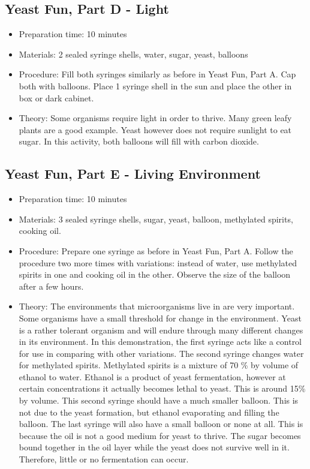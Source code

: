 \subsection{Yeast Fun, Part D - Light}
\begin{itemize}
\item{Preparation time: 10 minutes}
\item{Materials: 2 sealed syringe shells, water, sugar, yeast, balloons}
\item{Procedure: Fill both syringes similarly as before in Yeast Fun, Part A. Cap both with balloons. Place 1 syringe shell in the sun and place the other in box or dark cabinet.}
\item{Theory: Some organisms require light in order to thrive. Many green leafy plants are a good example. Yeast however does not require sunlight to eat sugar. In this activity, both balloons will fill with carbon dioxide.}
\end{itemize}


\subsection{Yeast Fun, Part E - Living Environment}
\begin{itemize}
\item{Preparation time: 10 minutes}
\item{Materials:  3 sealed syringe shells, sugar, yeast, balloon, methylated spirits, cooking oil.}
\item{Procedure: Prepare one syringe as before in Yeast Fun, Part A. Follow the procedure two more times with variations: instead of water, use methylated spirits in one and cooking oil in the other. Observe the size of the balloon after a few hours. }
\item{Theory: The environments that microorganisms live in are very important. Some organisms have a small threshold for change in the environment. Yeast is a rather tolerant organism and will endure through many different changes in its environment. In this demonstration, the first syringe acts like a control for use in comparing with other variations. The second syringe changes water for methylated spirits. Methylated spirits is a mixture of 70 \% by volume of ethanol to water. Ethanol is a product of yeast fermentation, however at certain concentrations it actually becomes lethal to yeast. This is around 15\% by volume. This second syringe should have a much smaller balloon. This is not due to the yeast formation, but ethanol evaporating and filling the balloon. The last syringe will also have a small balloon or none at all. This is because the oil is not a good medium for yeast to thrive. The sugar becomes bound together in the oil layer while the yeast does not survive well in it. Therefore, little or no fermentation can occur.}
\end{itemize}

